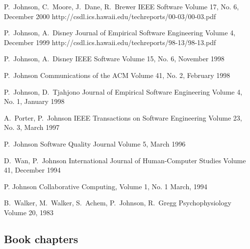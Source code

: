 \documentclass[11pt,letterpaper,sans]{moderncv} %
\begin{document}
          {P.~Johnson, C.~Moore, J.~Dane, R.~Brewer}
          {IEEE Software}
          {Volume 17, No. 6, December 2000}
          {http://csdl.ics.hawaii.edu/techreports/00-03/00-03.pdf}

          {P.~Johnson, A.~Disney}
          {Journal of Empirical Software Engineering}
          {Volume 4, December 1999}
          {http://csdl.ics.hawaii.edu/techreports/98-13/98-13.pdf}

          {P.~Johnson, A.~Disney}
          {IEEE Software}
          {Volume 15, No. 6, November 1998}

          {P.~Johnson}
          {Communications of the ACM}
          {Volume 41, No. 2, February 1998}

          {P.~Johnson, D.~Tjahjono}
          {Journal of Empirical Software Engineering}
          {Volume 4, No. 1, January 1998}

          {A.~Porter, P.~Johnson}
          {IEEE Transactions on Software Engineering}
          {Volume 23, No. 3, March 1997}

          {P.~Johnson}
          {Software Quality Journal}
          {Volume 5, March 1996}

          {D.~Wan, P.~Johnson}
          {International Journal of Human-Computer Studies}
          {Volume 41, December 1994}

          {P. Johnson}
          {Collaborative Computing, Volume 1, No. 1}
          {March, 1994}

          {B.~Walker, M.~Walker, S.~Achem, P.~Johnson, R.~Gregg}
          {Psychophysiology}
          {Volume 20, 1983}

\subsection{Book chapters}
\end{document}
